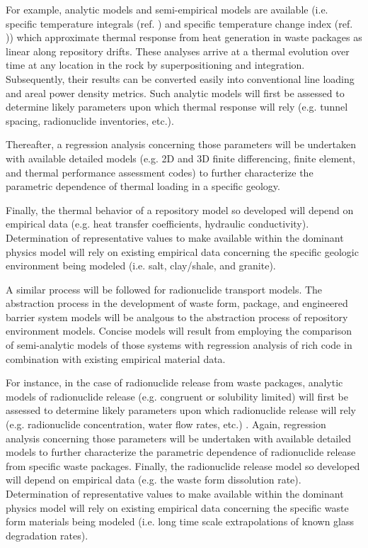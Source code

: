 For example, analytic models and semi-empirical models are available 
(i.e. specific temperature integrals (ref. \cite{li_methodology_2006}) and 
specific temperature change index (ref. \cite{radel_effect_2007})) which 
approximate thermal response from heat generation in waste packages as 
linear along repository drifts. These analyses arrive at a thermal 
evolution over time at any location in the rock by superpositioning 
and integration. Subsequently, their results can be converted easily 
into conventional line loading and areal power density metrics.  Such 
analytic models will first be assessed to determine likely parameters 
upon which thermal response will rely (e.g. tunnel spacing, radionuclide 
inventories, etc.).

Thereafter, a regression analysis concerning those parameters will be 
undertaken with available detailed models (e.g. 2D and 3D finite 
differencing, finite element, and thermal performance assessment codes) 
to further characterize the parametric dependence of thermal loading 
in a specific geology.  

Finally, the thermal behavior of a repository model so developed will 
depend on empirical data (e.g.  heat transfer coefficients, hydraulic 
conductivity). Determination of representative values to make available 
within the dominant physics model will rely on existing empirical data 
concerning the specific geologic environment being modeled (i.e. salt, 
clay/shale, and granite). 

A similar process will be followed for radionuclide transport models.  The 
abstraction process in the development of waste form, package, and 
engineered barrier system models will be analgous to the abstraction 
process of repository environment models. Concise models will result 
from employing the comparison of semi-analytic models of those systems 
with regression analysis of rich code in combination with existing 
empirical material data.

For instance, in the case of radionuclide release from waste packages, 
analytic models of radionuclide release (e.g.  congruent or solubility 
limited) will first be assessed to determine likely parameters upon 
which radionuclide release will rely (e.g.  radionuclide concentration, water 
flow rates, etc.) \cite{kawasaki_congruent_2004}.  Again, regression 
analysis concerning those parameters will be undertaken with available 
detailed models to further characterize the parametric dependence of 
radionuclide release from specific waste packages.  Finally, the radionuclide 
release model so developed will depend on empirical data (e.g. the 
waste form dissolution rate).  Determination of representative values to 
make available within the dominant physics model will rely on existing 
empirical data concerning the specific waste form  materials being 
modeled (i.e. long time scale extrapolations of known glass degradation 
rates).  

